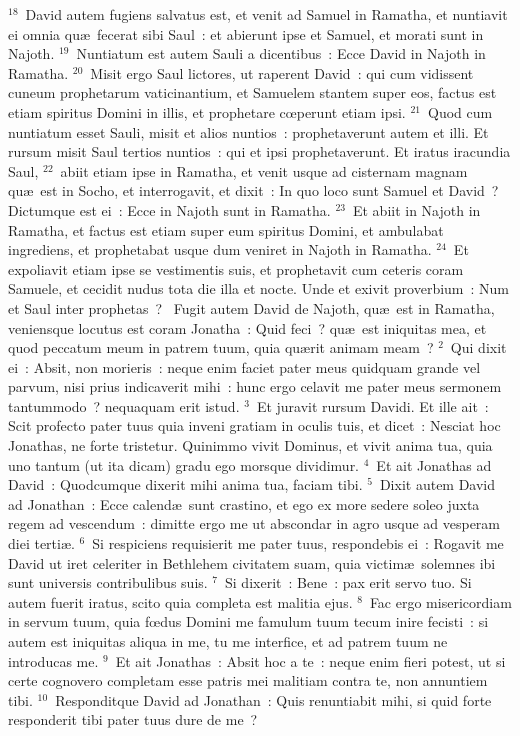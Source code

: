 ${}^{18}$~David autem fugiens salvatus est, et venit ad Samuel in Ramatha, et nuntiavit ei omnia qu\ae\ fecerat sibi Saul~: et abierunt ipse et Samuel, et morati sunt in Najoth.
${}^{19}$~Nuntiatum est autem Sauli a dicentibus~: Ecce David in Najoth in Ramatha.
${}^{20}$~Misit ergo Saul lictores, ut raperent David~: qui cum vidissent cuneum prophetarum vaticinantium, et Samuelem stantem super eos, factus est etiam spiritus Domini in illis, et prophetare cœperunt etiam ipsi.
${}^{21}$~Quod cum nuntiatum esset Sauli, misit et alios nuntios~: prophetaverunt autem et illi. Et rursum misit Saul tertios nuntios~: qui et ipsi prophetaverunt. Et iratus iracundia Saul,
${}^{22}$~abiit etiam ipse in Ramatha, et venit usque ad cisternam magnam qu\ae\ est in Socho, et interrogavit, et dixit~: In quo loco sunt Samuel et David~? Dictumque est ei~: Ecce in Najoth sunt in Ramatha.
${}^{23}$~Et abiit in Najoth in Ramatha, et factus est etiam super eum spiritus Domini, et ambulabat ingrediens, et prophetabat usque dum veniret in Najoth in Ramatha.
${}^{24}$~Et expoliavit etiam ipse se vestimentis suis, et prophetavit cum ceteris coram Samuele, et cecidit nudus tota die illa et nocte. Unde et exivit proverbium~: Num et Saul inter prophetas~?
~\lettrine[lines=10,image=true,loversize=0.05,lraise=-0.03]{F}{}ugit autem David de Najoth, qu\ae\ est in Ramatha, veniensque locutus est coram Jonatha~: Quid feci~? qu\ae\ est iniquitas mea, et quod peccatum meum in patrem tuum, quia qu\ae rit animam meam~?
${}^{2}$~Qui dixit ei~: Absit, non morieris~: neque enim faciet pater meus quidquam grande vel parvum, nisi prius indicaverit mihi~: hunc ergo celavit me pater meus sermonem tantummodo~? nequaquam erit istud.
${}^{3}$~Et juravit rursum Davidi. Et ille ait~: Scit profecto pater tuus quia inveni gratiam in oculis tuis, et dicet~: Nesciat hoc Jonathas, ne forte tristetur. Quinimmo vivit Dominus, et vivit anima tua, quia uno tantum (ut ita dicam) gradu ego morsque dividimur.
${}^{4}$~Et ait Jonathas ad David~: Quodcumque dixerit mihi anima tua, faciam tibi.
${}^{5}$~Dixit autem David ad Jonathan~: Ecce calend\ae\ sunt crastino, et ego ex more sedere soleo juxta regem ad vescendum~: dimitte ergo me ut abscondar in agro usque ad vesperam diei terti\ae .
${}^{6}$~Si respiciens requisierit me pater tuus, respondebis ei~: Rogavit me David ut iret celeriter in Bethlehem civitatem suam, quia victim\ae\ solemnes ibi sunt universis contribulibus suis.
${}^{7}$~Si dixerit~: Bene~: pax erit servo tuo. Si autem fuerit iratus, scito quia completa est malitia ejus.
${}^{8}$~Fac ergo misericordiam in servum tuum, quia fœdus Domini me famulum tuum tecum inire fecisti~: si autem est iniquitas aliqua in me, tu me interfice, et ad patrem tuum ne introducas me.
${}^{9}$~Et ait Jonathas~: Absit hoc a te~: neque enim fieri potest, ut si certe cognovero completam esse patris mei malitiam contra te, non annuntiem tibi.
${}^{10}$~Responditque David ad Jonathan~: Quis renuntiabit mihi, si quid forte responderit tibi pater tuus dure de me~?


